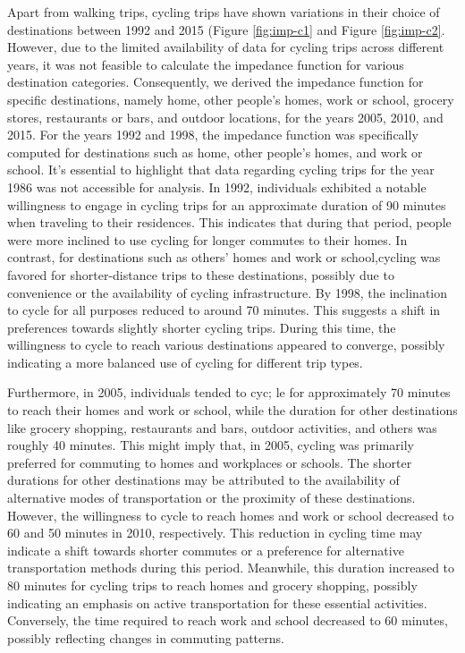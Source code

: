 \documentclass[12pt,twoside]{reedthesis}
\begin{document}
Apart from walking trips, cycling trips have shown variations in their choice of destinations between 1992 and 2015 (Figure \ref{fig:imp-c1} and Figure \ref{fig:imp-c2}. However, due to the limited availability of data for cycling trips across different years, it was not feasible to calculate the impedance function for various destination categories. Consequently, we derived the impedance function for specific destinations, namely home, other people's homes, work or school, grocery stores, restaurants or bars, and outdoor locations, for the years 2005, 2010, and 2015. For the years 1992 and 1998, the impedance function was specifically computed for destinations such as home, other people's homes, and work or school. It's essential to highlight that data regarding cycling trips for the year 1986 was not accessible for analysis. In 1992, individuals exhibited a notable willingness to engage in cycling trips for an approximate duration of 90 minutes when traveling to their residences. This indicates that during that period, people were more inclined to use cycling for longer commutes to their homes. In contrast, for destinations such as others' homes and work or school,cycling was favored for shorter-distance trips to these destinations, possibly due to convenience or the availability of cycling infrastructure. By 1998, the inclination to cycle for all purposes reduced to around 70 minutes. This suggests a shift in preferences towards slightly shorter cycling trips. During this time, the willingness to cycle to reach various destinations appeared to converge, possibly indicating a more balanced use of cycling for different trip types.

Furthermore, in 2005, individuals tended to cyc; le for approximately 70 minutes to reach their homes and work or school, while the duration for other destinations like grocery shopping, restaurants and bars, outdoor activities, and others was roughly 40 minutes. This might imply that, in 2005, cycling was primarily preferred for commuting to homes and workplaces or schools. The shorter durations for other destinations may be attributed to the availability of alternative modes of transportation or the proximity of these destinations. However, the willingness to cycle to reach homes and work or school decreased to 60 and 50 minutes in 2010, respectively. This reduction in cycling time may indicate a shift towards shorter commutes or a preference for alternative transportation methods during this period. Meanwhile, this duration increased to 80 minutes for cycling trips to reach homes and grocery shopping, possibly indicating an emphasis on active transportation for these essential activities. Conversely, the time required to reach work and school decreased to 60 minutes, possibly reflecting changes in commuting patterns.
\end{document}
